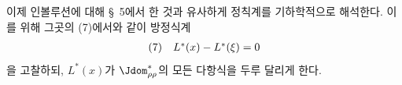 
이제 인볼루션에 대해 \S\ 5에서 한 것과 유사하게 정칙계를 기하학적으로 해석한다. 이를 위해 그곳의 (7)에서와 같이 방정식계
\[
\begin{array}{@{}l@{\quad}c@{}}
(7)& L^*(x)-L^*(\xi)=0
\end{array}
\]
을 고찰하되, $L^*(x)$가 $\Jdom^*_{\rho\rho}$의 모든 다항식을 두루 달리게 한다.
